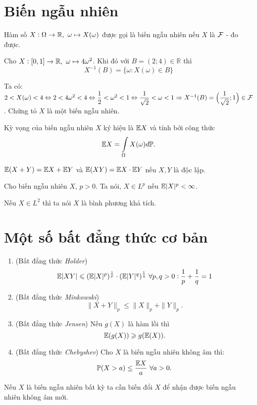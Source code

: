 \section{Biến ngẫu nhiên}
\begin{defn} Hàm số $X: \Omega \to \mathbb{R},~\omega \mapsto X(\omega)$ được gọi là biến ngẫu nhiên nếu $X$ là $\mathcal{F}$ - đo được.
\end{defn}
\begin{exam*}
Cho $X: [0,1] \to \mathbb{R},~\omega \mapsto 4\omega^2$. Khi đó với $ B = (2; 4) \in \mathbb R$ thì 
\[X^{-1}(B) = \{ \omega : X(\omega) \in B \}\]
\end{exam*}
\begin{sol*}
    Ta có: $2<X(\omega)<4 \Leftrightarrow 2<4\omega^2<4 \Leftrightarrow \dfrac{1}{2}<\omega^2<1 \Leftrightarrow \dfrac{1}{\sqrt{2}}<\omega<1 \Rightarrow X^{-1}(B) = \Big(\dfrac{1}{\sqrt{2}}; 1\Big) \in \mathcal{F}$. Chứng tỏ $X$ là một biến ngẫu nhiên.
\end{sol*}
\begin{defn}[Kỳ vọng] Kỳ vọng của biến ngẫu nhiên $X$ ký hiệu là $\mathbb{E} X$ và tính bởi công thức
    \[\mathbb{E} X = \displaystyle \displaystyle \int \limits_{\Omega} X(\omega)d\mathbb{P}.\]
\end{defn}
\begin{remark*}
$\mathbb{E}(X + Y) = \mathbb{E} X + \mathbb{E} Y$ và $\mathbb{E}(XY) = \mathbb{E} X\cdot\mathbb{E} Y$ nếu $X, Y$ là độc lập.
\end{remark*}
\begin{defn} Cho biến ngẫu nhiên $X$, $p>0$. Ta nói, $X\in L^p$ nếu $\mathbb{E}|X|^p < \infty$.
\end{defn}
\begin{remark*}
    Nếu $X \in L^2$ thì ta nói $X$ là bình phương khả tích.    
\end{remark*}
\section{Một số bất đẳng thức cơ bản}
\begin{enumerate}
    \item (Bất đẳng thức \textit{Holder})
        \[\mathbb{E}|XY| \leqslant (\mathbb{E}|X|^p)^\frac{1}{p} \cdot (\mathbb{E}|Y|^q)^\frac{1}{q}~\forall p,q>0: \dfrac{1}{p}+\dfrac{1}{q}=1\]
    \item (Bất đẳng thức \textit{Minkowski})
        \[\|X+Y\|_p \leqslant \|X\|_p + \|Y\|_p.\]
    \item (Bất đẳng thức \textit{Jensen}) Nếu $g(X)$ là hàm lồi thì \[\mathbb{E}(g(X)) \geqslant g(\mathbb{E}(X)).\]
    \item (Bất đẳng thức \textit{Chebyshev}) Cho $X$ là biến ngẫu nhiên không âm thì: \[\mathbb{P}(X>a) \leq \dfrac{\mathbb{E} X}{a} ~\forall a>0.\]
\end{enumerate}
\begin{remark*}
    Nếu $X$ là biến ngẫu nhiên bất kỳ ta cần biến đổi $X$ để nhận được biến ngẫu nhiên không âm mới. 
\end{remark*}
